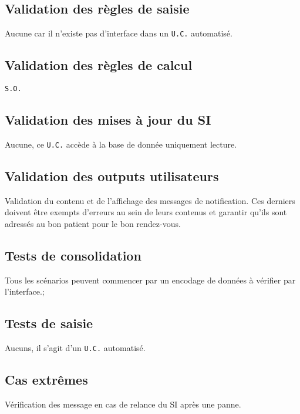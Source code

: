 	\subsection{Validation des règles de saisie}
	Aucune car il n’existe pas d’interface dans un \texttt{U.C.} automatisé.
	\subsection{Validation des règles de calcul}
	\texttt{S.O.}
	\subsection{Validation des mises à jour du SI}
	Aucune, ce \texttt{U.C.} accède à la base de donnée uniquement lecture.
	\subsection{Validation des outputs utilisateurs}
	Validation du contenu et de l'affichage des messages de notification. 
	Ces derniers doivent être exempts d’erreurs au sein de leurs contenus et
	garantir qu'ils sont adressés au bon patient pour le bon rendez-vous.
	\subsection{Tests de consolidation}
	Tous les scénarios peuvent commencer par un encodage de données à 
	vérifier par l'interface.;
	\subsection{Tests de saisie}
	Aucuns, il s’agit d’un \texttt{U.C.} automatisé.
	\subsection{Cas extrêmes}
	Vérification des message en cas de relance du SI après une panne.
